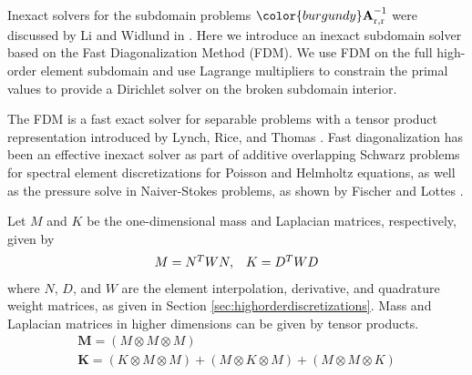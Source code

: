 Inexact solvers for the subdomain problems ${\color{burgundy}\mathbf{A}}_{\text{r}, \text{r}}^{-1}$ were discussed by Li and Widlund in \cite{li2007use}.
Here we introduce an inexact subdomain solver based on the Fast Diagonalization Method (FDM).
We use FDM on the full high-order element subdomain and use Lagrange multipliers to constrain the primal values to provide a Dirichlet solver on the broken subdomain interior.

The FDM is a fast exact solver for separable problems with a tensor product representation introduced by Lynch, Rice, and Thomas \cite{lynch1964direct}.
Fast diagonalization has been an effective inexact solver as part of additive overlapping Schwarz problems for spectral element discretizations for Poisson and Helmholtz equations, as well as the pressure solve in Naiver-Stokes problems, as shown by Fischer and Lottes \cite{fischer2005hybrid}.

Let $M$ and $K$ be the one-dimensional mass and Laplacian matrices, respectively, given by
\begin{equation}
\begin{array}{c c}
M = N^T W N,  &  K = D^T W D
\end{array}
\end{equation}
where $N$, $D$, and $W$ are the element interpolation, derivative, and quadrature weight matrices, as given in Section \ref{sec:highorderdiscretizations}.
Mass and Laplacian matrices in higher dimensions can be given by tensor products.
\begin{equation}
\begin{array}{c}
\mathbf{M} = \left( M \otimes M \otimes M \right)  \\
\mathbf{K} = \left( K \otimes M \otimes M \right) + \left( M \otimes K \otimes M \right) + \left( M \otimes M \otimes K \right)  \\
\end{array}
\end{equation}

